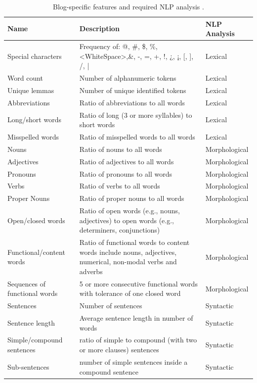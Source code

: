 \begin{table}[t]
	\center
	\caption {Blog-specific features and required NLP analysis \parencite{virik2017blog}.}
	\label{chap:relevant_work:tbl:blogs_special_features}
	\begin{tabular}{p{3cm}p{7cm}p{3cm}}
		\hline
		Name & Description & NLP Analysis\\
		\hline
		Special characters & Frequency of: @, \#, \$, \%, <WhiteSpace>,\&, -, =, +, !,  ¿, ¡, [, ], /, | & Lexical \\
		Word count & Number of alphanumeric tokens & Lexical \\
        Unique lemmas & Number of unique identified tokens & Lexical \\
        Abbreviations & Ratio of abbreviations to all words & Lexical \\
        Long/short words & Ratio of long (3 or more syllables) to short words & Lexical \\
        Misspelled words & Ratio of misspelled words to all words & Lexical\\
		Nouns & Ratio of nouns to all words & Morphological \\
        Adjectives & Ratio of adjectives to all words & Morphological \\
        Pronouns & Ratio of pronouns to all words & Morphological \\
        Verbs & Ratio of verbs to all words & Morphological \\
        Proper Nouns & Ratio of proper nouns to all words & Morphological \\
        Open/closed words & Ratio of open words (e.g., nouns, adjectives) to open words (e.g., determiners, conjunctions) & Morphological \\
        Functional/content words & Ratio of functional words to content words include nouns, adjectives, numerical, non-modal verbs and adverbs & Morphological \\
        Sequences of functional words & 5 or more consecutive functional words with tolerance of one closed word & Morphological \\
		Sentences & Number of sentences & Syntactic \\
        Sentence length & Average sentence length in number of words & Syntactic \\
        Simple/compound sentences & ratio of simple to compound (with two or more clauses) sentences & Syntactic \\
        Sub-sentences & number of simple sentences inside a compound sentence & Syntactic \\

\end{tabular}
\end{table}

